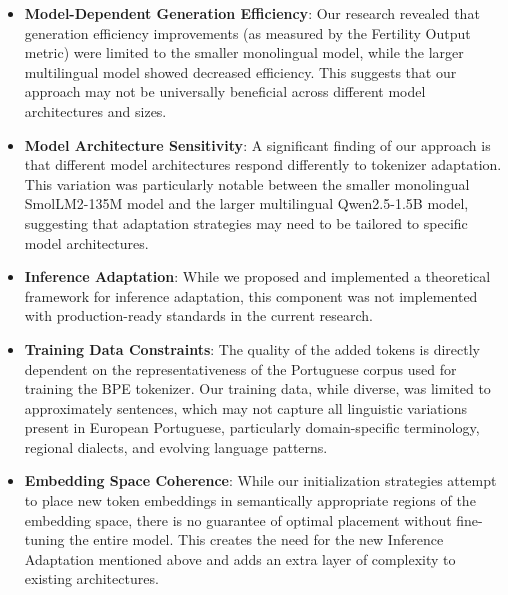 \begin{itemize}
    \item \textbf{Model-Dependent Generation Efficiency}: Our research revealed that generation efficiency improvements (as measured by the Fertility Output metric) were limited to the smaller monolingual model, while the larger multilingual model showed decreased efficiency. This suggests that our approach may not be universally beneficial across different model architectures and sizes.
    
    \item \textbf{Model Architecture Sensitivity}: A significant finding of our approach is that different model architectures respond differently to tokenizer adaptation. This variation was particularly notable between the smaller monolingual SmolLM2-135M model and the larger multilingual Qwen2.5-1.5B model, suggesting that adaptation strategies may need to be tailored to specific model architectures.
    
    \item \textbf{Inference Adaptation}: While we proposed and implemented a theoretical framework for inference adaptation, this component was not implemented with production-ready standards in the current research.
    
    \item \textbf{Training Data Constraints}: The quality of the added tokens is directly dependent on the representativeness of the Portuguese corpus used for training the BPE tokenizer. Our training data, while diverse, was limited to approximately  sentences, which may not capture all linguistic variations present in European Portuguese, particularly domain-specific terminology, regional dialects, and evolving language patterns.
    
    \item \textbf{Embedding Space Coherence}: While our initialization strategies attempt to place new token embeddings in semantically appropriate regions of the embedding space, there is no guarantee of optimal placement without fine-tuning the entire model. This creates the need for the new Inference Adaptation mentioned above and adds an extra layer of complexity to existing architectures.
    

\end{itemize}
